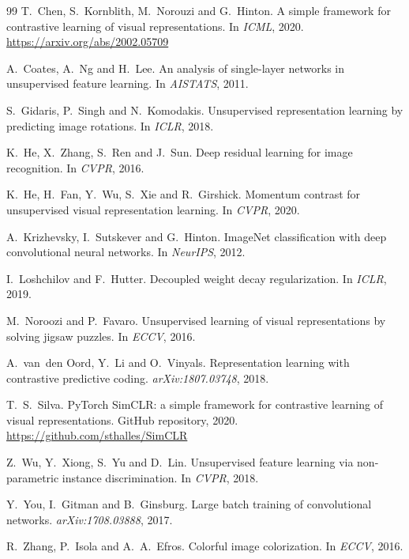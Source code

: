 \documentclass[11pt,a4paper]{article}
\begin{document}
\begin{thebibliography}{99}
T.~Chen, S.~Kornblith, M.~Norouzi and G.~Hinton.
\newblock A simple framework for contrastive learning of visual representations.
\newblock In \emph{ICML}, 2020. \url{https://arxiv.org/abs/2002.05709}

A.~Coates, A.~Ng and H.~Lee.
\newblock An analysis of single-layer networks in unsupervised feature learning.
\newblock In \emph{AISTATS}, 2011.

S.~Gidaris, P.~Singh and N.~Komodakis.
\newblock Unsupervised representation learning by predicting image rotations.
\newblock In \emph{ICLR}, 2018.

K.~He, X.~Zhang, S.~Ren and J.~Sun.
\newblock Deep residual learning for image recognition.
\newblock In \emph{CVPR}, 2016.

K.~He, H.~Fan, Y.~Wu, S.~Xie and R.~Girshick.
\newblock Momentum contrast for unsupervised visual representation learning.
\newblock In \emph{CVPR}, 2020.

A.~Krizhevsky, I.~Sutskever and G.~Hinton.
\newblock ImageNet classification with deep convolutional neural networks.
\newblock In \emph{NeurIPS}, 2012.

I.~Loshchilov and F.~Hutter.
\newblock Decoupled weight decay regularization.
\newblock In \emph{ICLR}, 2019.

M.~Noroozi and P.~Favaro.
\newblock Unsupervised learning of visual representations by solving jigsaw puzzles.
\newblock In \emph{ECCV}, 2016.

A.~van~den Oord, Y.~Li and O.~Vinyals.
\newblock Representation learning with contrastive predictive coding.
\newblock \emph{arXiv:1807.03748}, 2018.

T.~S.~Silva.
\newblock PyTorch SimCLR: a simple framework for contrastive learning of visual representations.
\newblock GitHub repository, 2020. \url{https://github.com/sthalles/SimCLR}

Z.~Wu, Y.~Xiong, S.~Yu and D.~Lin.
\newblock Unsupervised feature learning via non-parametric instance discrimination.
\newblock In \emph{CVPR}, 2018.

Y.~You, I.~Gitman and B.~Ginsburg.
\newblock Large batch training of convolutional networks.
\newblock \emph{arXiv:1708.03888}, 2017.

R.~Zhang, P.~Isola and A.~A.~Efros.
\newblock Colorful image colorization.
\newblock In \emph{ECCV}, 2016.
\end{thebibliography}
\end{document}
